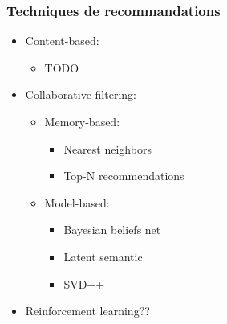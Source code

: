 \documentclass[11pt,sans]{beamer}
\begin{document}
    \begin{frame}
        \frametitle{Techniques de recommandations}

        \begin{itemize}
            \item Content-based:
                \begin{itemize}
                    \item TODO
                \end{itemize}
            \item Collaborative filtering:
                \begin{itemize}
                    \item Memory-based:
                        \begin{itemize}
                            \item Nearest neighbors
                            \item Top-N recommendations
                        \end{itemize}
                    \item Model-based:
                        \begin{itemize}
                            \item Bayesian beliefs net
                            \item Latent semantic
                            \item SVD++
                        \end{itemize}
                \end{itemize}
            \item Reinforcement learning??
        \end{itemize}
    \end{frame}
\end{document}

